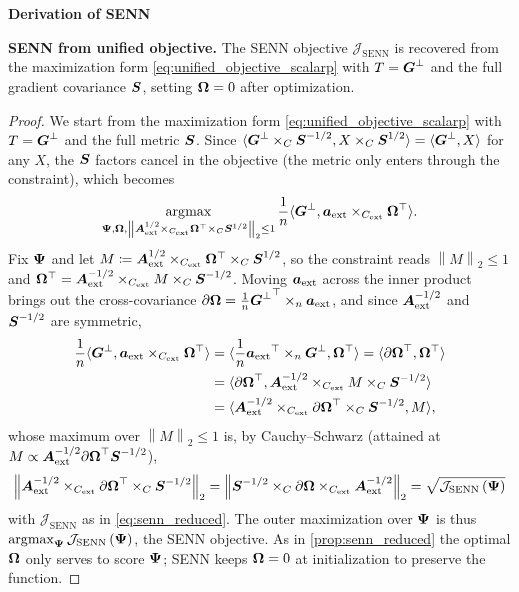 \noindent\textbf{Derivation of SENN}

\begin{proposition}\label{prop:senn_derivation}

\textbf{SENN from unified objective.} The SENN objective
\(\mathcal{J}_{\text{SENN}}\) is recovered from the maximization form
\autoref{eq:unified_objective_scalarp} with \(T = {\boldsymbol{G}^\perp}\) and the
full gradient covariance \(\boldsymbol{S}\), setting \(\boldsymbol{\Omega}{} = 0\) after
optimization.

\end{proposition}

\begin{proof}

We start from the maximization form \autoref{eq:unified_objective_scalarp}
with \(T = {\boldsymbol{G}^\perp}\) and the full metric \(\boldsymbol{S}\). Since
\({\langle{\boldsymbol{G}^\perp} \times_{C}\boldsymbol{S}^{-1/2},X \times_{C}\boldsymbol{S}^{1/2}\rangle} = {\langle{\boldsymbol{G}^\perp},X\rangle}\)
for any \(X\), the \(\boldsymbol{S}\) factors cancel in the objective (the
metric only enters through the constraint), which becomes
\[\operatorname*{\arg\!\max}_{\boldsymbol{\Psi}{},\boldsymbol{\Omega}{},\left\| {\boldsymbol{A}_{\text{ext}}^{1/2} \times_{C_{\text{ext}}}\boldsymbol{\Omega}{}^{\top} \times_{C}\boldsymbol{S}^{1/2}} \right\|_{2} \leq 1}\frac{1}{n}{\langle{\boldsymbol{G}^\perp},\boldsymbol{a_{\text{ext}}} \times_{C_{\text{ext}}}\boldsymbol{\Omega}{}^{\top}\rangle}.\]
Fix \(\boldsymbol{\Psi}{}\) and let
\(M \coloneqq \boldsymbol{A}_{\text{ext}}^{1/2} \times_{C_{\text{ext}}}\boldsymbol{\Omega}{}^{\top} \times_{C}\boldsymbol{S}^{1/2}\),
so the constraint reads \(\left\| M \right\|_{2} \leq 1\) and
\(\boldsymbol{\Omega}{}^{\top} = \boldsymbol{A}_{\text{ext}}^{-1/2} \times_{C_{\text{ext}}}M \times_{C}\boldsymbol{S}^{-1/2}\).
Moving \(\boldsymbol{a_{\text{ext}}}\) across the inner product brings out the
cross-covariance
\(\partial\boldsymbol{\Omega}{} = \frac{1}{n}{\boldsymbol{G}^\perp}^{\top} \times_{n}\boldsymbol{a_{\text{ext}}}\),
and since \(\boldsymbol{A}_{\text{ext}}^{-1/2}\) and \(\boldsymbol{S}^{-1/2}\) are symmetric,
\[\begin{aligned}
\frac{1}{n}{\langle{\boldsymbol{G}^\perp},\boldsymbol{a_{\text{ext}}} \times_{C_{\text{ext}}}\boldsymbol{\Omega}{}^{\top}\rangle} & = {\langle\frac{1}{n}\boldsymbol{a_{\text{ext}}}^{\top} \times_{n}{\boldsymbol{G}^\perp},\boldsymbol{\Omega}{}^{\top}\rangle} = {\langle{\partial\boldsymbol{\Omega}{}}^{\top},\boldsymbol{\Omega}{}^{\top}\rangle} \\
 & = {\langle{\partial\boldsymbol{\Omega}{}}^{\top},\boldsymbol{A}_{\text{ext}}^{-1/2} \times_{C_{\text{ext}}}M \times_{C}\boldsymbol{S}^{-1/2}\rangle} \\
 & = {\langle\boldsymbol{A}_{\text{ext}}^{-1/2} \times_{C_{\text{ext}}}{\partial\boldsymbol{\Omega}{}}^{\top} \times_{C}\boldsymbol{S}^{-1/2},M\rangle},
\end{aligned}\] whose maximum over \(\left\| M \right\|_{2} \leq 1\) is,
by Cauchy--Schwarz (attained at
\(M \propto \boldsymbol{A}_{\text{ext}}^{-1/2}{\partial\boldsymbol{\Omega}{}}^{\top}\boldsymbol{S}^{-1/2}\)),
\[\left\| {\boldsymbol{A}_{\text{ext}}^{-1/2} \times_{C_{\text{ext}}}{\partial\boldsymbol{\Omega}{}}^{\top} \times_{C}\boldsymbol{S}^{-1/2}} \right\|_{2} = \left\| {\boldsymbol{S}^{-1/2} \times_{C}\partial\boldsymbol{\Omega}{} \times_{C_{\text{ext}}}\boldsymbol{A}_{\text{ext}}^{-1/2}} \right\|_{2} = \sqrt{\mathcal{J}_{\text{SENN}}\left( \boldsymbol{\Psi}{} \right)}\]
with \(\mathcal{J}_{\text{SENN}}\) as in \autoref{eq:senn_reduced}. The
outer maximization over \(\boldsymbol{\Psi}{}\) is thus
\(\operatorname*{\arg\!\max}_{\boldsymbol{\Psi}{}}\mathcal{J}_{\text{SENN}}\left( \boldsymbol{\Psi}{} \right)\),
the SENN objective. As in \autoref{prop:senn_reduced} the optimal
\(\boldsymbol{\Omega}{}\) only serves to score \(\boldsymbol{\Psi}{}\); SENN keeps
\(\boldsymbol{\Omega}{} = 0\) at initialization to preserve the function.

\end{proof}

